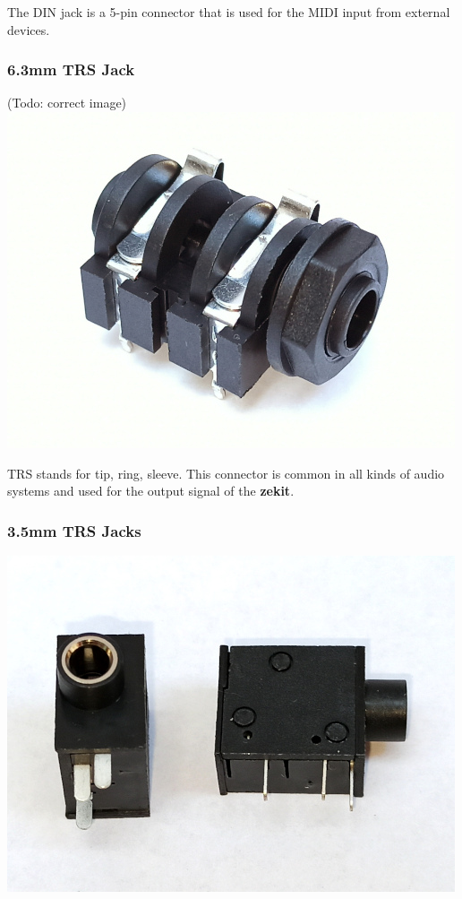 \documentclass{scrartcl}
\begin{document}
The DIN jack is a 5-pin connector that is used for the MIDI input from external devices.

\subsubsection{6.3mm TRS Jack}

\begin{center}
    (Todo: correct image)
    \includegraphics[scale=0.5]{assets/zekit-jack1-resized.jpg}
\end{center}

TRS stands for tip, ring, sleeve. This connector is common in all kinds of audio systems and used for the output signal of the \textbf{zekit}.

\subsubsection{3.5mm TRS Jacks}

\begin{center}
    \includegraphics[scale=0.5]{assets/zekit-jack2-resized.jpg}
\end{center}
\end{document}
